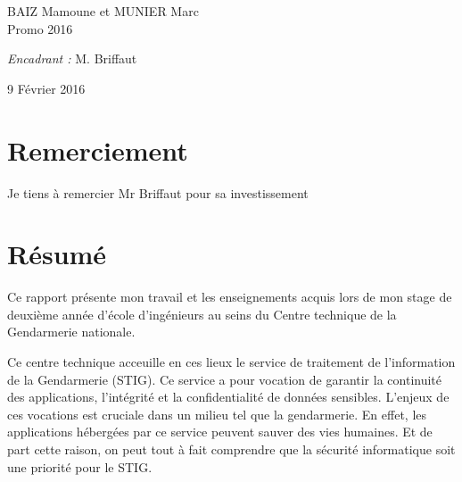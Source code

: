 {\begin{titlepage}
\begin{sffamily}
\begin{center}
    \begin{minipage}{0.4\textwidth}
      \begin{flushleft} \large
        BAIZ Mamoune et MUNIER Marc \\
        Promo 2016\\
      \end{flushleft}
    \end{minipage}
    \begin{minipage}{0.4\textwidth}
      \begin{flushright} \large
        \emph{Encadrant :} M. Briffaut\\
      \end{flushright}
    \end{minipage}

    \vfill

    {\large 9 Février 2016}

  \end{center}
  \end{sffamily}
\end{titlepage}
}
\newpage



\newpage
\section*{Remerciement}
Je tiens à remercier Mr Briffaut pour sa investissement 
\clearpage
\section*{Résumé}
Ce rapport présente mon travail et les enseignements acquis lors de mon stage de deuxième année d'école d'ingénieurs au seins du Centre technique de la Gendarmerie nationale. 

Ce centre technique acceuille en ces lieux le service de traitement de l'information de la Gendarmerie (STIG). Ce service a pour vocation de garantir la continuité des applications, l'intégrité et la confidentialité de données sensibles. L'enjeux de ces vocations est cruciale dans un milieu tel que la gendarmerie. En effet, les applications hébergées par ce service peuvent sauver des vies humaines. Et de part cette raison, on peut tout à fait comprendre que la sécurité informatique soit une priorité pour le STIG.

